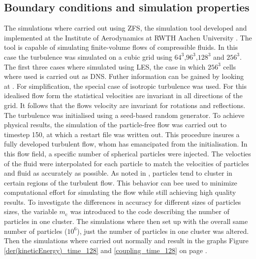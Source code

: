 \documentclass[a4paper,10pt]{article}
\numberwithin{equation}{section} %
\begin{document}
\subsection{Boundary conditions and simulation properties}
The simulations where carried out using ZFS, the simulation tool developed and implemented at the Institute of Aerodynamics at RWTH Aachen University 
\cite{anAdaptiveMultilevelMultigridFormulationForCartesianHierarchicalGridMethods} \cite{aStrictlyConservativeCartesianCutCellMethodForCompressibleViscousFlowsOnAdaptiveGrids}. 
The tool is capable of simulating finite-volume flows of compressible fluids. 
In this case the turbulence was simulated on a cubic grid using $64^3$,$96^3$,$128^3$ and $256^3$. The first three cases where simulated using LES, 
the case in which $256^3$ cells where used is carried out as DNS. Futher information can be gained by looking at \cite[p.344-357 for DNS and p. 558-639 for LES]{turbulentFlows}.
For simplification, the special case of isotropic turbulence was used. For this idealised flow form the statistical 
velocities are invariant in all directions of the grid. It follows that the flows velocity are invariant for rotations and reflections. 
The turbulence was initialised using a seed-based random generator. To achieve physical results, the simulation of the particle-free flow was carried out  to timestep 150, 
at which a restart file was written out. This procedure insures a fully developed turbulent 
flow, whom has emancipated from the initialisation. In this flow field, a specific number of spherical particles were injected. 
The velocties of the fluid were interpolated for each particle to match the velocities of particles and fluid as accurately as possible. 
\newline
{}
As noted in \cite{PreferentialConcentrationOfHeavyParticles}, particles tend to cluster in certain regions of the turbulent flow. This behavior can bee used to minimize computational effort for simulating the flow while still achieving high quality results. To investigate the differences in accuracy for different sizes of particles sizes, the variable $m_\mathrm{c}$ was introduced to the code describing the number of particles in one cluster. The simulations where then set up with the overall same number of particles ($ 10^6 $), just the number of particles in one cluster was altered. Then the simulations where carried out normally and result in the graphs Figure \ref{der(kineticEnergy)_time_128} and \ref{coupling_time_128} on page \pageref{coupling_time_128}. 
\end{document}
